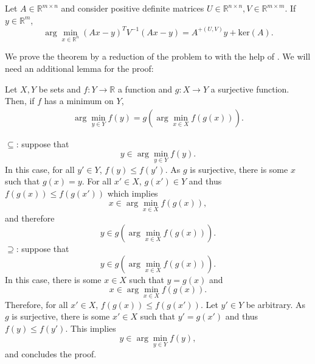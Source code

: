 \documentclass[a4paper,11pt]{report}
\begin{document}
\begin{The}\label{the:wls}
Let $A\in\mathbb{R}^{m\times n}$ and consider positive definite matrices $U\in\mathbb{R}^{n\times n},V\in\mathbb{R}^{m\times m}$. If $y\in\mathbb{R}^m$, 
\begin{equation}
\arg\min_{x\in\mathbb{R}^n}\left(Ax-y\right)^TV^{-1}\left(Ax-y\right)=
A^{+(U,V)}y+\text{ker}(A).
\end{equation}
\end{The}

\begin{Bew}
We prove the theorem by a reduction of the problem to  with the help of .
We will need an additional lemma for the proof:

\begin{BLem}\label{fargmin}
Let $X,Y$ be sets and $f:Y\to \mathbb{R}$ a function and $g:X\to Y$ a surjective function. Then, if $f$ has a minimum on $Y$, 
\begin{align*}
\arg\min_{y\in Y}f(y)=g\left(\arg\min_{x\in X}f\left(g(x)\right)\right).
\end{align*}
\end{BLem}

\begin{BBew}
$\subseteq$: suppose that
\[
y\in \arg\min_{y\in Y}f(y).
\]
In this case, for all $y'\in Y$, $f\left(y\right)\le f\left(y'\right)$. As $g$ is surjective, there is some $x$ such that $g(x)=y$. For all $x'\in X$, $g(x')\in Y$ and thus $f\left(g(x)\right)\le f\left(g(x')\right)$ which implies
\[
x\in \arg\min_{x\in X}f\left(g(x)\right),
\]
and therefore
\[
y\in g\left(\arg\min_{x\in X}f\left(g(x)\right)\right).
\]
$\supseteq$: suppose that
\[
y\in g\left(\arg\min_{x\in X}f\left(g(x)\right)\right).
\]
In this case, there is some $x\in X$ such that $y=g(x)$ and
\[
x\in \arg\min_{x\in X}f\left(g(x)\right).
\]
Therefore, for all $x'\in X$, $f\left(g(x)\right)\le f\left(g(x')\right)$. Let $y'\in Y$ be arbitrary. As $g$ is surjective, there is some $x'\in X$ such that $y'= g(x')$ and thus $f(y)\le f(y')$. This implies
\[
y\in \arg\min_{y\in Y}f(y),
\]
and concludes the proof.
\end{BBew}


\end{Bew}
\end{document}
